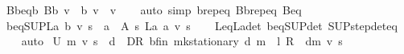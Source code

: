 \begin{isabellebody}
\endisatagproof
{\isafoldproof}%
%
\isadelimproof
\isanewline
%
\endisadelimproof
\isanewline
{}\isamarkupfalse%
\ B\isactrlsub b{\isacharunderscore}{\kern0pt}eq{\isacharunderscore}{\kern0pt}{\isasymL}\isactrlsub b{\isacharcolon}{\kern0pt}\ {\isachardoublequoteopen}B\isactrlsub b\ v\ {\isacharequal}{\kern0pt}\ {\isasymL}\isactrlsub b\ v\ {\isacharminus}{\kern0pt}\ v{\isachardoublequoteclose}\isanewline
%
\isadelimproof
\ \ %
\endisadelimproof
%
\isatagproof
{}\isamarkupfalse%
\ {\isacharparenleft}{\kern0pt}auto\ simp{\isacharcolon}{\kern0pt}\ {\isasymL}\isactrlsub b{\isachardot}{\kern0pt}rep{\isacharunderscore}{\kern0pt}eq\ B\isactrlsub b{\isachardot}{\kern0pt}rep{\isacharunderscore}{\kern0pt}eq\ B{\isacharunderscore}{\kern0pt}eq{\isacharunderscore}{\kern0pt}{\isasymL}{\isacharparenright}{\kern0pt}%
\endisatagproof
{\isafoldproof}%
%
\isadelimproof
\isanewline
%
\endisadelimproof
\isanewline
{}\isamarkupfalse%
\ {\isasymL}\isactrlsub b{\isacharunderscore}{\kern0pt}eq{\isacharunderscore}{\kern0pt}SUP{\isacharunderscore}{\kern0pt}L\isactrlsub a{\isacharcolon}{\kern0pt}\ {\isachardoublequoteopen}{\isasymL}\isactrlsub b\ v\ s\ {\isacharequal}{\kern0pt}\ {\isacharparenleft}{\kern0pt}{\isasymSqunion}a\ {\isasymin}\ A\ s{\isachardot}{\kern0pt}\ L\isactrlsub a\ a\ v\ s{\isacharparenright}{\kern0pt}{\isachardoublequoteclose}\isanewline
%
\isadelimproof
\ \ %
\endisadelimproof
%
\isatagproof
{}\isamarkupfalse%
\ L{\isacharunderscore}{\kern0pt}eq{\isacharunderscore}{\kern0pt}L\isactrlsub a{\isacharunderscore}{\kern0pt}det\ {\isasymL}\isactrlsub b{\isacharunderscore}{\kern0pt}eq{\isacharunderscore}{\kern0pt}SUP{\isacharunderscore}{\kern0pt}det\ SUP{\isacharunderscore}{\kern0pt}step{\isacharunderscore}{\kern0pt}det{\isacharunderscore}{\kern0pt}eq\isanewline
\ \ \isamarkupfalse%
\ auto%
\endisatagproof
{\isafoldproof}%
%
\isadelimproof
%
\endisadelimproof
%
\isadelimdocument
%
\endisadelimdocument
%
\isatagdocument
%
\isamarkuptrue%
%
\endisatagdocument
{\isafolddocument}%
%
\isadelimdocument
%
\endisadelimdocument
{}\isamarkupfalse%
\ {\isachardoublequoteopen}U\ m\ v\ s\ {\isacharequal}{\kern0pt}\ {\isacharparenleft}{\kern0pt}{\isasymSqunion}d\ {\isasymin}\ D\isactrlsub R{\isachardot}{\kern0pt}\ {\isacharparenleft}{\kern0pt}{\isasymnu}\isactrlsub b{\isacharunderscore}{\kern0pt}fin\ {\isacharparenleft}{\kern0pt}mk{\isacharunderscore}{\kern0pt}stationary\ d{\isacharparenright}{\kern0pt}\ m\ {\isacharplus}{\kern0pt}\ {\isacharparenleft}{\kern0pt}{\isacharparenleft}{\kern0pt}l\ {\isacharasterisk}{\kern0pt}\isactrlsub R\ {\isasymP}\ d{\isacharparenright}{\kern0pt}{\isacharcircum}{\kern0pt}{\isacharcircum}{\kern0pt}m{\isacharparenright}{\kern0pt}\ v{\isacharparenright}{\kern0pt}\ s{\isacharparenright}{\kern0pt}{\isachardoublequoteclose}%

\end{isabellebody}
